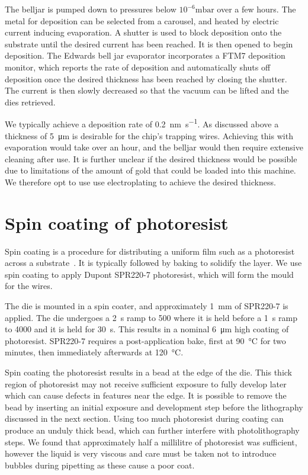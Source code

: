The belljar is pumped down to pressures below $10^{-6}\si{\milli\bar}$ over a
few hours. The metal for deposition can be selected from a carousel, and heated
by electric current inducing evaporation.  A shutter is used to block
deposition onto the substrate until the desired current has been reached. It is
then opened to begin deposition.
The Edwards bell jar evaporator incorporates a FTM7 deposition monitor, which
reports the rate of deposition and automatically shuts off deposition once the
desired thickness has been reached by closing the shutter. The current is then
slowly decreased so that the vacuum can be lifted and the dies retrieved.

We typically achieve a deposition rate of \SI{0.2}{\nano\meter\per\second}.  As
discussed above a thickness of \SI{5}{\micro\meter} is desirable for the chip's
trapping wires. Achieving this with evaporation would take over an hour, and
the belljar would then require extensive cleaning after use. It is further
unclear if the desired thickness would be possible due to limitations of the
amount of gold that could be loaded into this machine. We therefore opt to use
use electroplating to achieve the desired thickness.

\section{Spin coating of photoresist}
\label{fab:spin}

Spin coating is a procedure for distributing a uniform film such as a
photoresist  across a substrate~\cite{Cohen2011}. It is typically followed by
baking to solidify the layer. We use spin coating to apply Dupont SPR220-7
photoresist, which will form the mould for the wires.

The die is mounted in a spin coater, and approximately \SI{1}{\milli\meter} of
SPR220-7 is applied. The die undergoes a \SI{2}{\second} ramp to \SI{500}{\rpm}
where it is held before a \SI{1}{\second} ramp to \SI{4000}{\rpm} and it is
held for \SI{30}{\second}. This results in a nominal \SI{6}{\micro\meter} high
coating of photoresist. SPR220-7 requires a post-application bake, first at
\SI{90}{\celsius} for two minutes, then immediately afterwards at
\SI{120}{\celsius}.

Spin coating the photoresist results in a bead at the edge of the die. This
thick region of photoresist may not receive sufficient exposure to fully
develop later which can cause defects in features near the edge. It is possible
to remove the bead by inserting an initial exposure and development step before
the lithography discussed in the next section. Using too much photoresist
during coating can produce an unduly thick bead, which can further interfere
with photolithography steps. We found that approximately half a millilitre of
photoresist was sufficient, however the liquid is very viscous and care must be
taken not to introduce bubbles during pipetting as these cause a poor coat.

